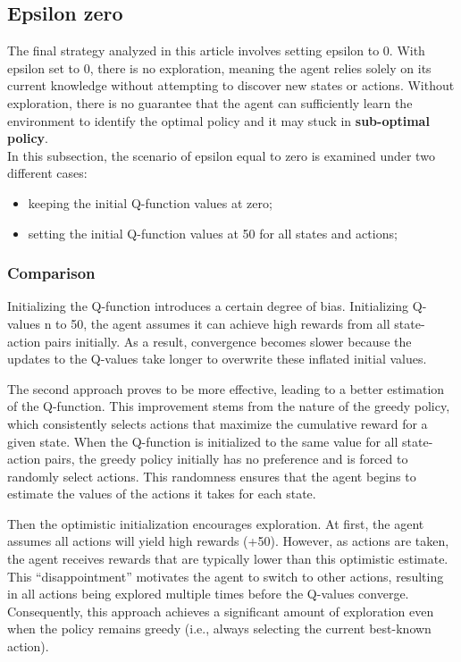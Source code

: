 \documentclass{article}
\begin{document}
\newpage

\subsection{Epsilon zero}
The final strategy analyzed in this article involves setting epsilon to 0. With epsilon set to 0, there is no exploration, meaning the agent relies solely on its current knowledge without attempting to discover new states or actions. Without exploration, there is no guarantee that the agent can sufficiently learn the environment to identify the optimal policy and it may stuck in \textbf{sub-optimal policy}.\\
In this subsection, the scenario of epsilon equal to zero is examined under two different cases:
\begin{itemize}
	\item keeping the initial Q-function values at zero;
	\item setting the initial Q-function values at 50 for all states and actions;
\end{itemize}

\subsubsection{Comparison}
Initializing the Q-function introduces a certain degree of bias. Initializing Q-values n to 50, the agent assumes it can achieve high rewards from all state-action pairs initially. As a result, convergence becomes slower because the updates to the Q-values take longer to overwrite these inflated initial values.

The second approach proves to be more effective, leading to a better estimation of the Q-function. This improvement stems from the nature of the greedy policy, which consistently selects actions that maximize the cumulative reward for a given state. When the Q-function is initialized to the same value for all state-action pairs, the greedy policy initially has no preference and is forced to randomly select actions. This randomness ensures that the agent begins to estimate the values of the actions it takes for each state.

Then the optimistic initialization encourages exploration. At first, the agent assumes all actions will yield high rewards (+50). However, as actions are taken, the agent receives rewards that are typically lower than this optimistic estimate. This “disappointment” motivates the agent to switch to other actions, resulting in all actions being explored multiple times before the Q-values converge. Consequently, this approach achieves a significant amount of exploration even when the policy remains greedy (i.e., always selecting the current best-known action).
\end{document}
